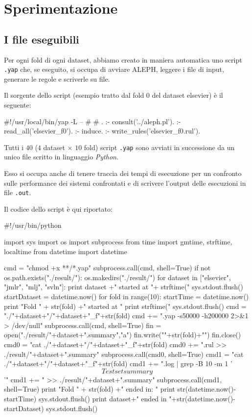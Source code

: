 \section{Sperimentazione}

\subsection{I file eseguibili}
Per ogni fold di ogni dataset, abbiamo creato in maniera automatica uno script \verb+.yap+ che, se eseguito, si occupa di avviare ALEPH, leggere i file di input, generare le regole e scriverle su file.

Il sorgente dello script (esempio tratto dal fold 0 del dataset elsevier) è il seguente:

\begin{prologcode}
#!/usr/local/bin/yap -L --
#
# .
:- consult('../aleph.pl').
:- read_all('elsevier_f0').
:- induce.
:- write_rules('elsevier_f0.rul').
\end{prologcode}

Tutti i $40$ ($4$ dataset $\times$ $10$ fold) script \verb+.yap+ sono avviati in successione da un unico file scritto in linguaggio \emph{Python}.

Esso si occupa anche di tenere traccia dei tempi di esecuzione per un confronto sulle performance dei sistemi confrontati e di scrivere l'output delle esecuzioni in file \verb+.out+.

Il codice dello script è qui riportato:

\begin{pythoncode}
#!/usr/bin/python

import sys
import os
import subprocess
from time import gmtime, strftime, localtime
from datetime import datetime

cmd = "chmod +x **/*.yap"
subprocess.call(cmd, shell=True)
if not os.path.exists("./result/"):
    os.makedirs("./result/")
for dataset in ["elsevier", "jmlr", "mlj", "svln"]:
    print dataset +" started at "+ strftime("%
    sys.stdout.flush()
    startDataset = datetime.now()
    for fold in range(10):
        startTime = datetime.now()
        print "Fold " + str(fold) +" started at "
        print strftime("%
        sys.stdout.flush()
        cmd = "./"+dataset+"/"+dataset+"_f"+str(fold)
        cmd += ".yap -s50000 -h200000 2>&1 > /dev/null"
        subprocess.call(cmd, shell=True)
        fin = open("./result/"+dataset+".summary","a")
        fin.write("\nFold "+str(fold)+"\n")
        fin.close()
        cmd0 = "cat ./"+dataset+"/"+dataset+"_f"+str(fold)
        cmd0 += ".rul >> ./result/"+dataset+".summary"
        subprocess.call(cmd0, shell=True)
        cmd1 = "cat ./"+dataset+"/"+dataset+"_f"+str(fold)
        cmd1 += ".log | grep -B 10 -m 1 '\[Test set summary\]'"
        cmd1 += " >> ./result/"+dataset+".summary"
        subprocess.call(cmd1, shell=True)
        print "Fold " + str(fold) +" ended in: "
        print str(datetime.now()-startTime)
        sys.stdout.flush()
    print dataset+" ended in "+str(datetime.now()-startDataset)
    sys.stdout.flush()
\end{pythoncode}


